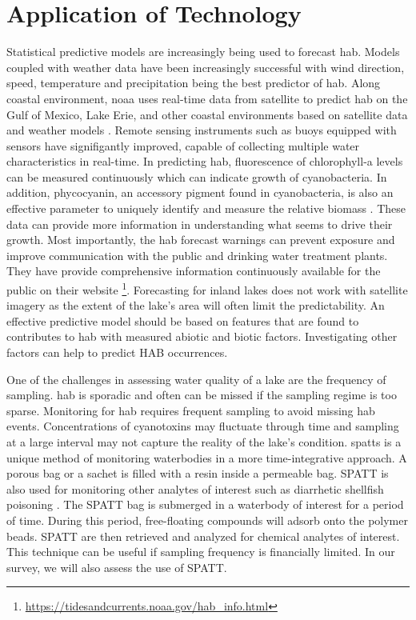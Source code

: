\section{Application of Technology}
Statistical predictive models are increasingly being used to forecast \gls{hab}. Models coupled with weather data have been increasingly successful with wind direction, speed, temperature and precipitation being the best predictor of \gls{hab}. Along coastal environment,   \gls{noaa} uses real-time data from satellite to predict \gls{hab} on the Gulf of Mexico, Lake Erie, and other coastal environments based on satellite data and weather models \cite{kavanaugh_assessment_2013}. Remote sensing instruments such as buoys equipped with sensors have signifigantly improved, capable of collecting multiple water characteristics in real-time. In predicting \gls{hab}, fluorescence of chlorophyll-a levels can be measured continuously which can indicate growth of cyanobacteria. In addition, phycocyanin, an accessory pigment found in cyanobacteria, is also an effective parameter to uniquely identify and measure the relative biomass \cite{ahn_rainfall_2002,li_semi-analytical_2012}. These data can provide more information in understanding what seems to drive their growth. Most importantly, the \gls{hab} forecast warnings can prevent exposure and improve communication with the public and drinking water treatment plants. They have provide comprehensive information continuously available for the public on their website \footnote{\url{https://tidesandcurrents.noaa.gov/hab_info.html}}. Forecasting for inland lakes does not work with satellite imagery as the extent of the lake's area will often limit the predictability. An effective predictive model should be based on features that are found to contributes to \gls{hab} with measured abiotic and biotic factors. Investigating other factors can help to predict HAB occurrences.

One of the challenges in assessing water quality of a lake are the frequency of sampling. \gls{hab} is sporadic and often can be missed if the sampling regime is too sparse. Monitoring for \gls{hab} requires frequent sampling to avoid missing  \gls{hab} events. Concentrations of cyanotoxins may fluctuate through time and sampling at a large interval may not capture the reality of the lake's condition. \gls{spatts} is a unique method of monitoring waterbodies in a more time-integrative approach. A porous bag or a sachet is filled with a resin inside a permeable bag. SPATT is also used for monitoring other analytes of interest such as diarrhetic shellfish poisoning \cite{mackenzie_solid_2004}. %
The SPATT bag  is submerged in a waterbody of interest for a period of time. During this period, free-floating compounds will adsorb onto the polymer beads.  SPATT are then retrieved and analyzed for chemical analytes of interest. This technique can be useful if sampling frequency is financially limited. In our survey, we will also assess the use of SPATT.



